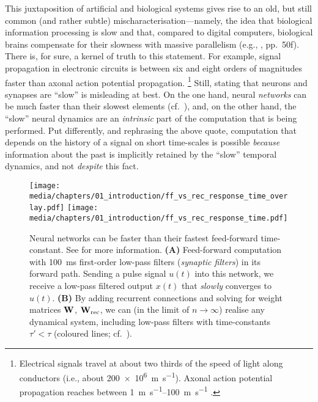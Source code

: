This juxtaposition of artificial and biological systems gives rise to an old, but still common (and rather subtle) mis\-cha\-rac\-te\-ri\-sa\-tion---namely, the idea that biological information processing is slow and that, compared to digital computers, biological brains compensate for their slowness with massive parallelism (e.g., \cite{vonneumann1958computer}, pp.~50f).
There is, for sure, a kernel of truth to this statement.
For example, signal propagation in electronic circuits is between six and eight orders of magnitudes faster than axonal action potential propagation.%
\footnote{Electrical signals travel at about two thirds of the speed of light along conductors (i.e., about \SI{200e6}{\metre\per\second}). Axonal action potential propagation reaches between \SIrange{1}{100}{\metre\per\second} \citep[Chapter~2, p.~23]{kandel2012principles}.}
Still, stating that neurons and synapses are \enquote{slow} is misleading at best.
On the one hand, neural \emph{networks} can be much faster than their slowest elements (cf.~), and, on the other hand, the \enquote{slow} neural dynamics are an \emph{intrinsic} part of the computation that is being performed.
Put differently, and rephrasing the above  quote, computation that depends on the history of a signal on short time-scales is possible \emph{because} information about the past is implicitly retained by the \enquote{slow} temporal dynamics, and not \emph{despite} this fact.

\begin{figure}[p]
	\centering
	\texttt{[image: media/chapters/01\_introduction/ff\_vs\_rec\_response\_time\_overlay.pdf]}%
	\kern-158mm\texttt{[image: media/chapters/01\_introduction/ff\_vs\_rec\_response\_time.pdf]}
	\caption[Neural networks can be faster than their fastest time-constant]{Neural networks can be faster than their fastest feed-forward time-constant. See  for more information.
	\textbf{(A)} Feed-forward computation with \SI{100}{\milli\second} first-order low-pass filters (\emph{synaptic filters}) in its forward path. Sending a pulse signal $u(t)$ into this network, we receive a low-pass filtered output $x(t)$ that \emph{slowly} converges to $u(t)$.
	\textbf{(B)} By adding recurrent connections and solving for weight matrices $\mathbf{W}$, $\mathbf{W}_\mathrm{rec}$, we can (in the limit of $n \to \infty$) realise any dynamical system, including low-pass filters with time-constants $\tau' < \tau$ (coloured lines;  cf.~\cite[Chapter~8]{eliasmith2003neural}).
	}
	\label{fig:ff_vs_rec_response_time}
\end{figure}

